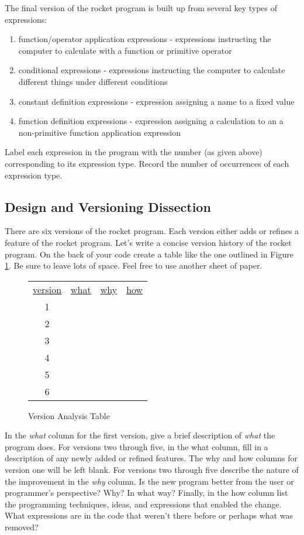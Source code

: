\documentclass[nobib]{tufte-handout}
\begin{document}
The final version of the rocket program is built up from several key types of expressions:
\begin{enumerate}
  \item function/operator application expressions - expressions instructing the computer to calculate with a function or primitive operator
  \item conditional expressions - expressions instructing the computer to calculate different things under different conditions
  \item constant definition expressions - expression assigning a name to a fixed value
  \item function definition expressions - expression assigning a calculation to an a non-primitive function application expression
\end{enumerate}
Label each expression in the program with the number (as given above) corresponding to its expression type. Record the number of occurrences of each expression type.

\subsection{Design and Versioning Dissection}

There are six versions of the rocket program. Each version either adds or refines a feature of the rocket program. Let's write a concise version history of the rocket program.  On the back of your code create a table like the one outlined in Figure \ref{fig:vertab}. Be sure to leave lots of space. Feel free to use another sheet of paper.

\begin{figure}[ht]
  \center
  \begin{tabular}{cccc}
    \underline{version} & \underline{what} & \underline{why} & \underline{how} \\
    1 & & & \\
    2 & & & \\
    3 & & & \\
    4 & & & \\
    5 & & & \\
    6 & & &
  \end{tabular}
  \caption{Version Analysis Table}
  \label{fig:vertab}
\end{figure}

In the \textit{what} column for the first version, give a brief description of \textit{what} the program does. For versions two through five, in the what column, fill in a description of any newly added or refined features. The why and how columns for version one will be left blank. For versions two through five describe the nature of the improvement in the \textit{why} column. Is the new program better from the user or programmer's perspective? Why? In what way? Finally, in the how column list the programming techniques, ideas, and expressions that enabled the change. What expressions are in the code that weren't there before or perhaps what was removed?
\end{document}
